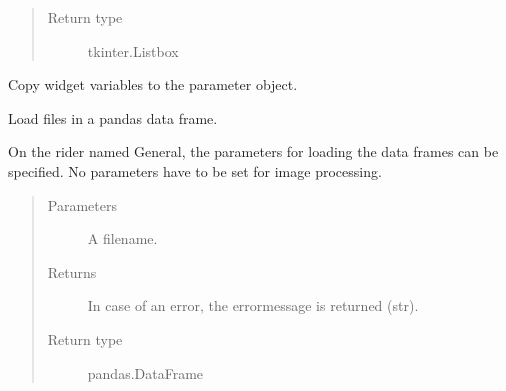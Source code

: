 \documentclass[letterpaper,10pt,english]{sphinxmanual}
\begin{document}
\begin{fulllineitems}
\begin{fulllineitems}
\begin{quote}
\begin{description}
\item[{Return type}] \leavevmode
tkinter.Listbox

\end{description}\end{quote}

\end{fulllineitems}


\begin{fulllineitems}
\label{\detokenize{openpivgui:openpivgui.OpenPivGui.OpenPivGui.get_settings}}
Copy widget variables to the parameter object.

\end{fulllineitems}


\begin{fulllineitems}
\label{\detokenize{openpivgui:openpivgui.OpenPivGui.OpenPivGui.load_pandas}}
Load files in a pandas data frame.

On the rider named General, the parameters for loading
the data frames can be specified.
No parameters have to be set for image processing.
\begin{quote}\begin{description}
\item[{Parameters}] \leavevmode
{} \textendash{} A filename.

\item[{Returns}] \leavevmode
In case of an error, the errormessage is returned (str).

\item[{Return type}] \leavevmode
pandas.DataFrame

\end{description}\end{quote}

\end{fulllineitems}



\end{fulllineitems}
\end{document}
